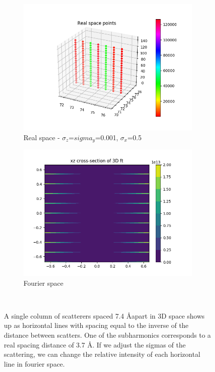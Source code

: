 \documentclass{article}
\begin{document}
\begin{figure}[h]
\begin{subfigure}{0.45\textwidth}
        \end{subfigure}
        \begin{subfigure}{0.45\textwidth}
                \centering
                \includegraphics[width=\textwidth]{real_3d_highysig.png}
                \caption{Real space - $\sigma_z$=$sigma_y$=0.001, $\sigma_x$=0.5}\label{fig:real_3d_highysig}
        \end{subfigure}
        \begin{subfigure}{0.45\textwidth}
                \centering
                \includegraphics[width=\textwidth]{fourier_3d_highysig.png}
                \caption{Fourier space}\label{fig:fourier_3d_highysig}
        \end{subfigure}
        \caption{A single column of scatterers spaced 7.4 \AA apart in 3D space shows up as horizontal lines
                 with spacing equal to the inverse of the distance between scatters. One of the
                 subharmonics corresponds to a real spacing distance of 3.7 \AA. If we adjust the
                 sigmas of the scattering, we can change the relative intensity of each
                 horizontal line in fourier space.}~\label{fig:3d_simple}
\end{figure}
\end{document}
